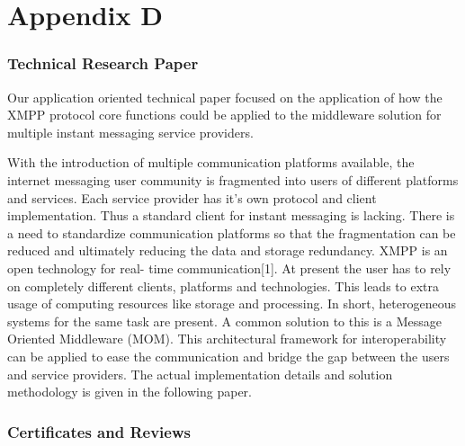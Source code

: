 \documentclass{SureshLimkar}
\begin{document}
\chapter{Appendix D}

\subsection{Technical Research Paper}

Our application oriented technical paper focused on the application of how the XMPP protocol core functions could be 
applied to the middleware solution for multiple instant messaging service providers.

With the introduction of multiple communication
platforms available, the internet messaging user community is
fragmented into users of different platforms and services. Each
service provider has it's own protocol and client implementation.
Thus a standard client for instant messaging is lacking. There is
a need to standardize communication platforms so that the
fragmentation can be reduced and ultimately reducing the data
and storage redundancy. XMPP is an open technology for real-
time communication[1]. At present the user has to rely on
completely different clients, platforms and technologies. This
leads to extra usage of computing resources like storage and
processing. In short, heterogeneous systems for the same task are
present. A common solution to this is a Message Oriented
Middleware (MOM). This architectural framework for
interoperability can be applied to ease the communication and
bridge the gap between the users and service providers. The actual implementation details and solution methodology is given 
in the following paper.



\subsection{Certificates and Reviews}
\end{document}
